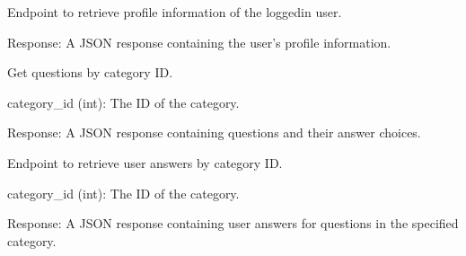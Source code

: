 \documentclass[letterpaper,10pt,english]{sphinxmanual}
\begin{document}
\begin{fulllineitems}
\label{\detokenize{routes.questionnaire:routes.questionnaire.routes.get_profile_info}}
\pysigstartsignatures
{}
\pysigstopsignatures
\sphinxAtStartPar
Endpoint to retrieve profile information of the logged\sphinxhyphen{}in user.
\begin{description}
\sphinxAtStartPar
Response: A JSON response containing the user’s profile information.

\end{description}

\end{fulllineitems}


\begin{fulllineitems}
\label{\detokenize{routes.questionnaire:routes.questionnaire.routes.get_questions_by_category}}
\pysigstartsignatures
{}
\pysigstopsignatures
\sphinxAtStartPar
Get questions by category ID.
\begin{description}
\sphinxAtStartPar
category\_id (int): The ID of the category.

\sphinxAtStartPar
Response: A JSON response containing questions and their answer choices.

\end{description}

\end{fulllineitems}


\begin{fulllineitems}
\label{\detokenize{routes.questionnaire:routes.questionnaire.routes.get_user_answers_by_category}}
\pysigstartsignatures
{}
\pysigstopsignatures
\sphinxAtStartPar
Endpoint to retrieve user answers by category ID.
\begin{description}
\sphinxAtStartPar
category\_id (int): The ID of the category.

\sphinxAtStartPar
Response: A JSON response containing user answers for questions in the specified category.

\end{description}

\end{fulllineitems}
\end{document}
